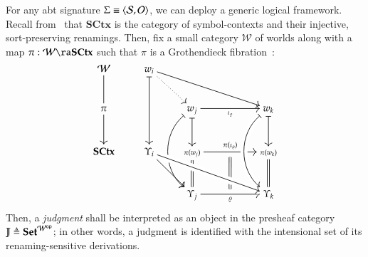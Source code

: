 \documentclass[11pt]{article}
\theoremstyle{definition}
\theoremstyle{remark}
\numberwithin{equation}{section}
\def\IModeColorName{MidnightBlue}
\def\OModeColorName{Maroon}
\def\IModeColorName{Black}
\def\OModeColorName{Black}
\newcommand\IMode[1]{{\color{\IModeColorName}{#1}}}
\newcommand\OMode[1]{{\color{\OModeColorName}{#1}}}
\newcommand\Of[2]{\IMode{#1}: \IMode{#2}}
\newcommand\Match[2]{\IMode{#1}\equiv\OMode{#2}}
\newcommand\Sorts{\mathcal{S}}
\newcommand\Operators{\mathcal{O}}
\newcommand\Sets{\mathbf{Set}}
\newcommand\SCtx{\mathbf{SCtx}}
\newcommand\OpCat[1]{#1^{\mathsf{op}}}
\newcommand\Pair[2]{\left\langle#1, #2 \right\rangle}
\newcommand\Define[2]{\IMode{#1}\triangleq\OMode{#2}}
\begin{document}
For any abt signature $\Match{\Sigma}{\Pair{\Sorts}{\Operators}}$, we can deploy
a generic logical framework. Recall from~\cite{sterling-morrison:2015} that
$\SCtx$ is the category of symbol-contexts and their injective, sort-preserving
renamings. Then, fix a small category $\mathcal{W}$ of worlds along with a map
$\Of{\pi}{\mathcal{W}\ra\SCtx}$ such that $\pi$ is a Grothendieck
fibration~\cite{jacobs:2001, taylor:1999}:
\[
  \begin{tikzcd}[cramped, ampersand replacement = \&, row sep = large]
    {\IMode{\mathcal{W}}}
      \arrow[dash, d]
\&
    {\IMode{{w}_{i}}}
      \arrow[drrr]
      \arrow[dotted, dr]
      \arrow[mapsto, dd]
\&
    \null
\&
    \null
\&
    \null
\\
    {\IMode{{\pi}}}
      \arrow[d]
\&
    \null
\&
    {\OMode{{w}_{j}}}
      \arrow[rr, swap, "\OMode{{\iota}_{\varrho}}"]
      \arrow[mapsto, dd, bend right = 50]
      \arrow[mapsto, d]
\&
    \null
\&
    |[alias = Wk]|{\IMode{{w}_{k}}}
      \arrow[mapsto, d]
\\
    {\IMode{\SCtx}}
\&
    |[alias = Ui]|{\IMode{{\Upsilon}_{i}}}
      \arrow[dr]
\&
    {\OMode{\scriptstyle{{\pi}({w}_{j})}}}
      \arrow[rr, "\OMode{{\pi}({\iota}_{\varrho})}", ""{name = Msrc, swap}]
      \arrow[equals, d]
\&
    \null
\&
    {\IMode{\scriptstyle{{\pi}({w}_{k})}}}
      \arrow[equals, d]
\\
    \null
\&
    \null
\&
    {\IMode{{\Upsilon}_{j}}}
      \arrow[rr, swap, "{\IMode{\varrho}}", ""{name = Mtgt, swap}]
\&
    \null
\&
    |[alias = Uk]|{\IMode{{\Upsilon}_{k}}}
      \arrow[mapsto, from = Wk, to = Uk, bend right = 50, crossing over]
      \arrow[equals, from = Msrc, to = Mtgt]
      \arrow[from = Ui, to = Uk, crossing over]
  \end{tikzcd}
\]
Then, a \emph{judgment} shall be interpreted as an object in the presheaf
category $\Define{\mathbb{J}}{\Sets^{\OpCat{\mathcal{W}}}}$; in other words, a
judgment is identified with the intensional set of its renaming-sensitive
derivations.
\end{document}
